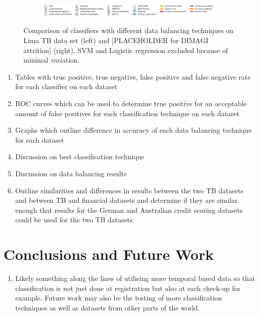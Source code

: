 \documentclass{sig-alternate-05-2015}
\begin{document}
\begin{figure}
\begin{subfigure}{.5\textwidth}
			\label{fig:res}
		\end{subfigure}
		\vspace*{-0.5cm}\hspace*{-3cm}\begin{subfigure}{\textwidth}
			\includegraphics[scale=0.6]{legend}
			\label{fig:res}
		\end{subfigure}
		\caption{Comparison of classifiers with different data balancing techniques on Lima TB data set (left) and [PLACEHOLDER for DIMAGI attrition] (right). SVM and Logistic regression excluded because of minimal variation.}
	\end{figure}
	

	\label{results}
	\begin{enumerate}
		\item Tables with true positive, true negative, false positive and false negative rate for each classifier on each dataset
		\item ROC curves which can be used to determine true positive for an acceptable amount of false positives for each classification technique on each dataset
		\item Graphs which outline difference in accuracy of each data balancing technique for each dataset
		\item Discussion on best classification technique
		\item Discussion on data balancing results
		\item Outline similarities and differences in results between the two TB datasets and between TB and financial datasets and determine if they are similar enough that results for the German and Australian credit scoring datasets could be used for the two TB datasets.
	\end{enumerate}
	
	\section{Conclusions and Future Work}
	\begin{enumerate}
		\item Likely something along the lines of utilising more temporal based data so that classification is not just done at registration but also at each check-up for example. Future work may also be the testing of more classification techniques as well as datasets from other parts of the world.
	\end{enumerate}
	
	
\end{document}

